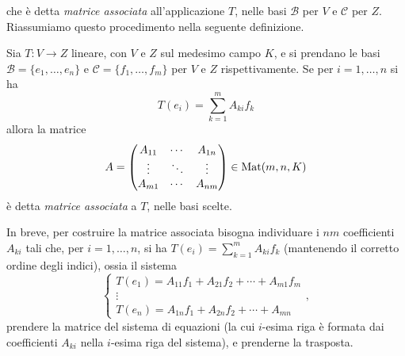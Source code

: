 che è detta \emph{matrice associata} all'applicazione $T$, nelle basi $\mathcal B$ per $V$ e $\mathcal C$ per $Z$.
Riassumiamo questo procedimento nella seguente definizione.
\begin{definizione} \label{d:matrice-associata}
	Sia $T\colon V\to Z$ lineare, con $V$ e $Z$ sul medesimo campo $K$, e si prendano le basi $\mathcal B=\{e_1,\dots,e_n\}$ e $\mathcal C=\{f_1,\dots,f_m\}$ per $V$ e $Z$ rispettivamente.
	Se per $i=1,\dots,n$ si ha
	\begin{equation}
		T(e_i)=\sum_{k=1}^mA_{ki}f_k
	\end{equation}
	allora la matrice
	\begin{equation}
		A=
		\begin{pmatrix}
			A_{11}&\cdots&A_{1n}\\
			\vdots&\ddots&\vdots\\
			A_{m1}&\cdots&A_{nm}
		\end{pmatrix}
		\in\operatorname{Mat}(m,n,K)
	\end{equation}
	è detta \emph{matrice associata} a $T$, nelle basi scelte.
\end{definizione}
In breve, per costruire la matrice associata bisogna individuare i $nm$ coefficienti $A_{ki}$ tali che, per $i=1,\dots,n$, si ha $T(e_i)=\sum_{k=1}^mA_{ki}f_k$ (mantenendo il corretto ordine degli indici), ossia il sistema
\begin{equation}
	\begin{cases}
		T(e_1)=A_{11}f_1+A_{21}f_2+\cdots+A_{m1}f_m\\
		\vdots\\
		T(e_n)=A_{1n}f_1+A_{2n}f_2+\cdots+A_{mn}
	\end{cases},
\end{equation}
prendere la matrice del sistema di equazioni (la cui $i$-esima riga è formata dai coefficienti $A_{ki}$ nella $i$-esima riga del sistema), e prenderne la trasposta.


